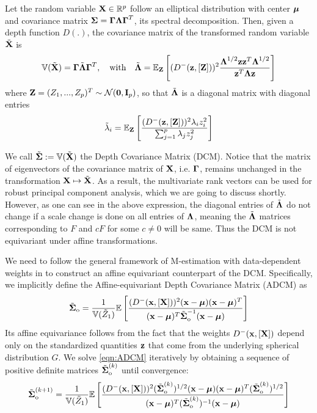 \begin{Theorem} \label{Theorem:covform}
Let the random variable ${\mathbf{X}} \in \mathbb{R}^p$ follow an elliptical distribution with center ${\boldsymbol{\mu}}$ and covariance matrix ${\boldsymbol{\Sigma}} = {\boldsymbol{\Gamma}}{\boldsymbol{\Lambda}}{\boldsymbol{\Gamma}}^T$, its spectral decomposition. Then, given a depth function $D(.)$, the covariance matrix of the transformed random variable $\tilde{{\mathbf{X}}}$ is
%
\begin{align} \label{equation:covformEq1}
{\mathbb{V}}(\tilde {{\mathbf{X}}}) = {\boldsymbol{\Gamma}} \tilde {{\boldsymbol{\Lambda}}} {\boldsymbol{\Gamma}}^T,\quad\mbox{with}\quad \tilde {{\boldsymbol{\Lambda}}} = \mathbb E_{\mathbf{Z}} \left[ (D^- ( {\bf{z}}, [{\mathbf{Z}}]) )^2 \frac{{\boldsymbol{\Lambda}}^{ 1/2 } {\bf{z}} {\bf{z}}^{T} {\boldsymbol{\Lambda}}^{ 1/2 }}{{\bf{z}}^T {\boldsymbol{\Lambda}} {\bf{z}}} \right]
\end{align}
%
where ${\mathbf{Z}} = (Z_1,...,Z_p)^T \sim {\cal{N}} ({\bf 0}, {\mathbf{I}}_p)$, so that $\tilde {{\boldsymbol{\Lambda}}}$ is a diagonal matrix with diagonal entries
%
\begin{align}
\tilde \lambda_{i} = {\mathbb{E}}_{\mathbf{Z}} \left[ \frac{(D^- ( {\bf{z}}, [{\mathbf{Z}}]) )^2 \lambda_i z_i^2}{\sum_{j=1}^p \lambda_j z_j^2} \right]
\end{align}
%
\end{Theorem}

We call $\tilde {{\boldsymbol{\Sigma}}} := {\mathbb{V}}(\tilde {{\mathbf{X}}})$ the Depth Covariance Matrix (DCM).  Notice that the matrix of eigenvectors of the covariance matrix of ${\mathbf{X}}$, i.e. ${\boldsymbol{\Gamma}}$, remains unchanged in the transformation ${\mathbf{X}} \mapsto \tilde {{\mathbf{X}}}$. As a result, the multivariate rank vectors can be used for robust principal component analysis, which we are going to discuss shortly. However, as one can see in the above expression, the diagonal entries of $\tilde {{\boldsymbol{\Lambda}}}$ do not change if a scale change is done on all entries of ${\boldsymbol{\Lambda}}$, meaning the $\tilde {{\boldsymbol{\Lambda}}}$ matrices corresponding to $F$ and $cF$ for some $c \neq 0$ will be same. Thus the DCM is not equivariant under affine transformations.

We need to follow the general framework of M-estimation with data-dependent weights in \cite{HuberBook81} to construct an affine equivariant counterpart of the DCM. Specifically, we implicitly define the Affine-equivariant Depth Covariance Matrix (ADCM) as
%
\begin{equation} \label{eqn:ADCM}
\tilde {{\boldsymbol{\Sigma}}}_{\text{o}} = \frac{1}{{\mathbb{V}}(\tilde Z_1) } {\mathbb{E}} \left[ \frac{(D^- ({\bf{x}}, [{\mathbf{X}}]))^2 ({\bf{x}} - {\boldsymbol{\mu}}) ({\bf{x}} - {\boldsymbol{\mu}})^T}{({\bf{x}} - {\boldsymbol{\mu}})^T \tilde {{\boldsymbol{\Sigma}}}_{\text{o}} ^{-1} ({\bf{x}} - {\boldsymbol{\mu}})} \right]
\end{equation}
%
Its affine equivariance follows from the fact that the weights $D^- ({\bf{x}}, [{\mathbf{X}}])$ depend only on the standardized quantities ${\bf{z}}$ that come from the underlying spherical distribution $G$. We solve \ref{eqn:ADCM} iteratively by obtaining a sequence of positive definite matrices $\tilde {{\boldsymbol{\Sigma}}}^{(k)}_{\text{o}}$ until convergence:
%
$$ \tilde {{\boldsymbol{\Sigma}}}^{(k+1)}_{\text{o}} = \frac{1}{{\mathbb{V}}(\tilde Z_1) } {\mathbb{E}} \left[ \frac{(D^- ({\bf{x}}, [{\mathbf{X}}]))^2 (\tilde {{\boldsymbol{\Sigma}}}^{(k)}_{\text{o}})^{1/2} ({\bf{x}} - {\boldsymbol{\mu}}) ({\bf{x}} - {\boldsymbol{\mu}})^T (\tilde {{\boldsymbol{\Sigma}}}^{(k)}_{\text{o}})^{1/2}}{({\bf{x}} - {\boldsymbol{\mu}})^T (\tilde {{\boldsymbol{\Sigma}}}^{(k)}_{\text{o}})^{-1} ({\bf{x}} - {\boldsymbol{\mu}})} \right] $$
%

